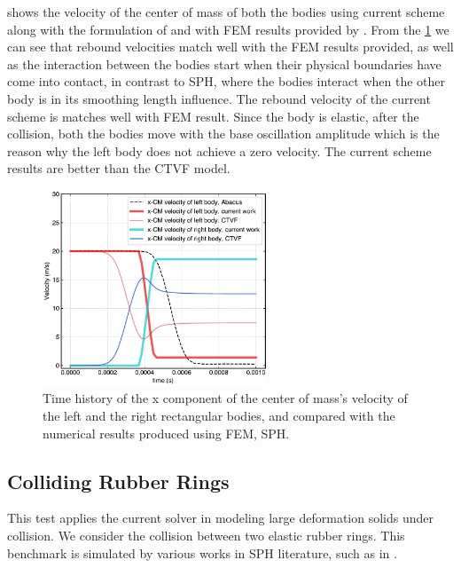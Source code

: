  shows the velocity of the
center of mass of both the bodies using current scheme along with the
formulation of \textcite{gray2001sph} and with FEM results provided by
\textcite{yan2021simulation}. From the
\cref{fig:results-yan-linear-velocity-vs-time} we can see that rebound
velocities match well with the FEM results provided, as well as the
interaction between the bodies start when their physical boundaries have come
into contact, in contrast to SPH, where the bodies interact when the other
body is in its smoothing length influence. The rebound velocity of the current
scheme is matches well with FEM result. Since the body is elastic,
after the collision, both the bodies move with the base oscillation amplitude
which is the reason why the left body does not achieve a zero velocity.
The current scheme results are better than the CTVF model.
\begin{figure}[!htpb]
  \centering
  \includegraphics[width=0.6\textwidth]{figures/csph/figures/yan_2021_linear_interface/velocity_vs_time}
  \caption{Time history of the x component of the center of mass's velocity of
    the left and the right rectangular bodies, and compared with the numerical
    results produced using FEM, SPH.}
\label{fig:results-yan-linear-velocity-vs-time}
\end{figure}


\FloatBarrier%
\subsection{Colliding Rubber Rings}
\label{sec:results-rings}
This test applies the current solver in modeling large deformation solids
under collision. We consider the collision between two elastic rubber rings.
This benchmark is simulated by various works in SPH literature, such as in
\textcite{gray2001sph,adepu2021corrected,zhang2017generalized}.

